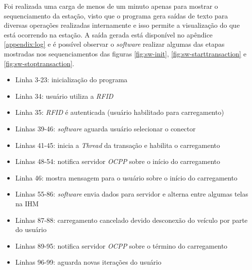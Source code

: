     Foi realizada uma carga de menos de um minuto apenas para mostrar o sequenciamento da estação, visto que o programa gera saídas de texto para diversas operações realizadas internamente e isso permite a visualização do que está ocorrendo na estação. A saída gerada está disponível no apêndice \ref{appendix:log} e é possível observar o \textit{software} realizar algumas das etapas mostradas nos sequenciamentos das figuras \ref{fig:sw-init}, \ref{fig:sw-starttransaction} e \ref{fig:sw-stoptransaction}.

    \begin{itemize}
      \item Linha 3-23: inicialização do programa
      \item Linha 34: usuário utiliza a \textit{\ac{RFID}}
      \item Linha 35: \textit{\ac{RFID}} é autenticada (usuário habilitado para carregamento)
      \item Linhas 39-46: \textit{software} aguarda usuário selecionar o conector
      \item Linhas 41-45: inicia a \textit{Thread} da transação e habilita o carregamento
      \item Linhas 48-54: notifica servidor \textit{\ac{OCPP}} sobre o início do carregamento
      \item Linha 46: mostra mensagem para o usuário sobre o início do carregamento
      \item Linhas 55-86: \textit{software} envia dados para servidor e alterna entre algumas telas na \ac{IHM}
      \item Linhas 87-88: carregamento cancelado devido desconexão do veículo por parte do usuário
      \item Linhas 89-95: notifica servidor \textit{\ac{OCPP}} sobre o término do carregamento
      \item Linhas 96-99: aguarda novas iterações do usuário
    \end{itemize}